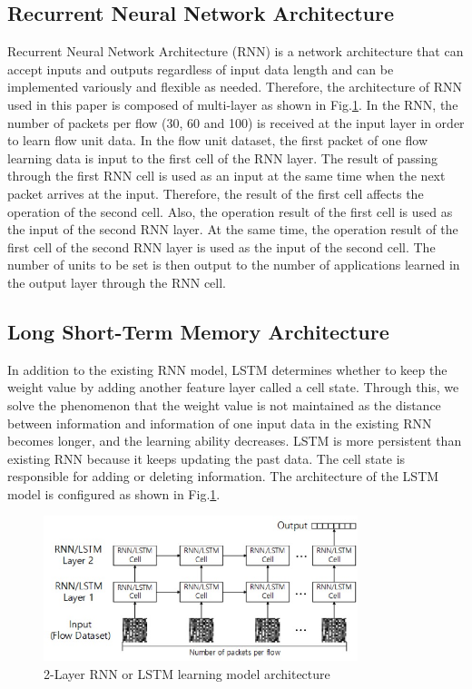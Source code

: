 \subsection{Recurrent Neural Network Architecture}
Recurrent Neural Network Architecture (RNN) \cite{J279188} is a network architecture that can accept inputs and outputs regardless of input data length and can be implemented variously and flexible as needed.
Therefore, the architecture of RNN used in this paper is composed of multi-layer as shown in Fig.\ref{fig5}.
In the RNN, the number of packets per flow (30, 60 and 100) is received at the input layer in order to learn flow unit data.
In the flow unit dataset, the first packet of one flow learning data is input to the first cell of the RNN layer.
The result of passing through the first RNN cell is used as an input at the same time when the next packet arrives at the input.
Therefore, the result of the first cell affects the operation of the second cell.
Also, the operation result of the first cell is used as the input of the second RNN layer.
At the same time, the operation result of the first cell of the second RNN layer is used as the input of the second cell.
The number of units to be set is then output to the number of applications learned in the output layer through the RNN cell.


\subsection{Long Short-Term Memory Architecture}
In addition to the existing RNN model, LSTM \cite{Hochreiter:1997:LSM:1246443.1246450} determines whether to keep the weight value by adding another feature layer called a cell state.
Through this, we solve the phenomenon that the weight value is not maintained as the distance between information and information of one input data in the existing RNN becomes longer, and the learning ability decreases.
LSTM is more persistent than existing RNN because it keeps updating the past data.
The cell state is responsible for adding or deleting information.
The architecture of the LSTM model is configured as shown in Fig.\ref{fig5}.

\begin{figure}[t]
\centering
\setlength{\abovecaptionskip}{0pt}
\setlength{\belowcaptionskip}{0pt}
{
\includegraphics[width=3.6in]{fig5.jpg}
\caption{2-Layer RNN or LSTM learning model architecture}
\label{fig5}
}
\end{figure}

